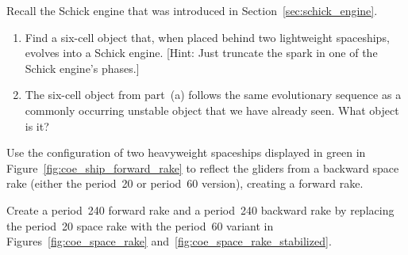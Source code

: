 \begin{multicols}{2}
	
	\mfilbreak
	
	
	\begin{problemstar}\label{exer:six_cell_schick} 
		Recall the Schick engine that was introduced in Section~\ref{sec:schick_engine}.\smallskip
		\begin{enumerate}[label=\bf\color{ocre}(\alph*)]
			\item Find a six-cell object that, when placed behind two lightweight spaceships, evolves into a Schick engine. [Hint: Just truncate the spark in one of the Schick engine's phases.]
			
			\item The six-cell object from part~(a) follows the same evolutionary sequence as a commonly occurring unstable object that we have already seen. What object is it?
		\end{enumerate}
	\end{problemstar}
	
	
	\mfilbreak
	
	
	\begin{problemstar}\label{exer:back_to_forward_space_rake} 
		Use the configuration of two heavyweight spaceships displayed in green in Figure~\ref{fig:coe_ship_forward_rake} to reflect the gliders from a backward space rake (either the period~20 or period~60 version), creating a forward rake.
	\end{problemstar}
	
	
	\mfilbreak
	
	
	\begin{problem}\label{exer:p240_rake} 
		Create a period~240 forward rake and a period~240 backward rake by replacing the period~20 space rake with the period~60 variant in Figures~\ref{fig:coe_space_rake} and~\ref{fig:coe_space_rake_stabilized}.
	\end{problem}
	

\end{multicols}
